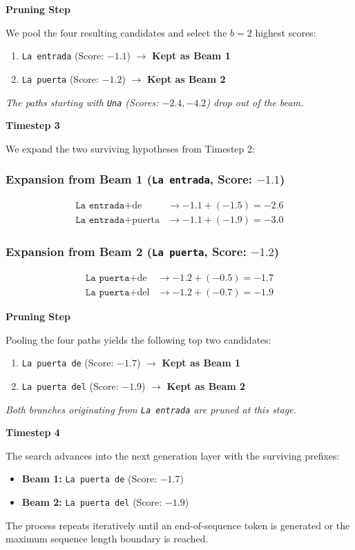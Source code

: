 {\textbf{Pruning Step}

We pool the four resulting candidates and select the $b=2$ highest scores:
\begin{enumerate}
    \item \texttt{La entrada} (Score: $-1.1$) $\rightarrow$ \textbf{Kept as Beam 1}
    \item \texttt{La puerta} (Score: $-1.2$) $\rightarrow$ \textbf{Kept as Beam 2}
\end{enumerate}
\textit{The paths starting with \texttt{Una} (Scores: $-2.4, -4.2$) drop out of the beam.}

\textbf{Timestep 3}

We expand the two surviving hypotheses from Timestep 2:

\subsubsection*{Expansion from Beam 1 (\texttt{La entrada}, Score: $-1.1$)}
\begin{align*}
\texttt{La entrada} + \text{de}     &\rightarrow -1.1 + (-1.5) = -2.6 \\
\texttt{La entrada} + \text{puerta} &\rightarrow -1.1 + (-1.9) = -3.0
\end{align*}

\subsubsection*{Expansion from Beam 2 (\texttt{La puerta}, Score: $-1.2$)}
\begin{align*}
\texttt{La puerta} + \text{de}  &\rightarrow -1.2 + (-0.5) = -1.7 \\
\texttt{La puerta} + \text{del} &\rightarrow -1.2 + (-0.7) = -1.9
\end{align*}

\textbf{Pruning Step}

Pooling the four paths yields the following top two candidates:
\begin{enumerate}
    \item \texttt{La puerta de} (Score: $-1.7$) $\rightarrow$ \textbf{Kept as Beam 1}
    \item \texttt{La puerta del} (Score: $-1.9$) $\rightarrow$ \textbf{Kept as Beam 2}
\end{enumerate}
\textit{Both branches originating from \texttt{La entrada} are pruned at this stage.}

\textbf{Timestep 4}

The search advances into the next generation layer with the surviving prefixes:
\begin{itemize}
    \item \textbf{Beam 1:} \texttt{La puerta de} (Score: $-1.7$)
    \item \textbf{Beam 2:} \texttt{La puerta del} (Score: $-1.9$)
\end{itemize}
The process repeats iteratively until an end-of-sequence token is generated or the maximum sequence length boundary is reached.
}{}

